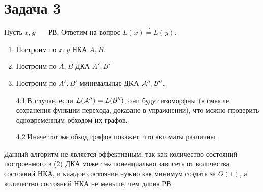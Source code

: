 \documentclass[a4paper]{article}
\def\A{{\cal A}}
\def\B{{\cal B}}
\begin{document}
\section*{Задача 3}
Пусть $x,y$~--- РВ. Ответим на вопрос $L(x)\overset{?}{=}L(y)$.
\begin{enumerate}
\item Построим по $x,y$ НКА $A,B$.
\item Построим по $A,B$ ДКА $A',B'$
\item Построим по $A',B'$ минимальные ДКА $\A'',\B''$. 
\item [4.1] В случае, если $L(\A'')=L(\B'')$, они будут изоморфны (в смысле сохранения функции перехода, доказано в упражнении), что можно проверить одновременным обходом их графов.
\item [4.2] Иначе тот же обход графов покажет, что автоматы различны.
\end{enumerate}
Данный алгоритм не является эффективным, так как количество состояний построенного в (2) ДКА может экспоненциально зависеть от количества состояний НКА, и каждое состояние нужно как минимум создать за $O(1)$, а количество состояний НКА не меньше, чем длина РВ.
\newpage
\end{document}
